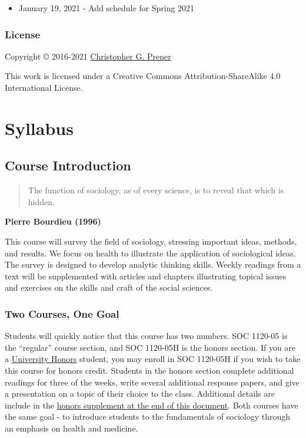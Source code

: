 \documentclass[
]{book}
\providecommand{\tightlist}{%
  \setlength{\itemsep}{0pt}\setlength{\parskip}{0pt}}
\begin{document}
\begin{itemize}
\tightlist
\item
  January 19, 2021 - Add schedule for Spring 2021
\end{itemize}

\hypertarget{license}{%
\section*{License}\label{license}}

Copyright © 2016-2021 \href{https://chris-prener.github.io}{Christopher G. Prener}

This work is licensed under a Creative Commons Attribution-ShareAlike 4.0 International License.

\hypertarget{part-syllabus}{%
\part{Syllabus}\label{part-syllabus}}

\hypertarget{course-introduction}{%
\chapter{Course Introduction}\label{course-introduction}}

\begin{quote}
The function of sociology, as of every science, is to reveal that which is hidden.
\end{quote}

\textbf{Pierre Bourdieu (1996)}

This course will survey the field of sociology, stressing important ideas, methods, and results. We focus on health to illustrate the application of sociological ideas. The survey is designed to develop analytic thinking skills. Weekly readings from a text will be supplemented with articles and chapters illustrating topical issues and exercises on the skills and craft of the social sciences.

\hypertarget{two-courses-one-goal}{%
\section{Two Courses, One Goal}\label{two-courses-one-goal}}

Students will quickly notice that this course has two numbers. SOC 1120-05 is the ``regular'' course section, and SOC 1120-05H is the honors section. If you are a \href{https://www.slu.edu/honors/index.php}{University Honors} student, you may enroll in SOC 1120-05H if you wish to take this course for honors credit. Students in the honors section complete additional readings for three of the weeks, write several additional response papers, and give a presentation on a topic of their choice to the class. Additional details are include in the \href{/syllabus/honors-overview.html}{honors supplement at the end of this document}. Both courses have the same goal - to introduce students to the fundamentals of sociology through an emphasis on health and medicine.
\end{document}
